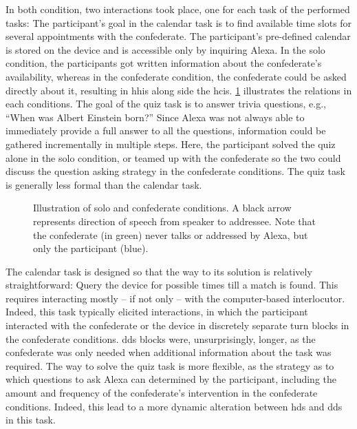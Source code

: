 In both condition, two interactions took place, one for each task of the performed tasks:
The participant's goal in the calendar task is to find available time slots for several appointments with the confederate.
The participant's pre-defined calendar is stored on the device and is accessible only by inquiring Alexa.
In the solo condition, the participants got written information about the confederate's availability, whereas in the confederate condition, the confederate could be asked directly about it, resulting in \acp{hhi} along side the \acp{hci}.
\cref{fig:conditions_comparison} illustrates the relations in each conditions.
The goal of the quiz task is to answer trivia questions, e.g., \enquote{When was Albert Einstein born?}
Since Alexa was not always able to immediately provide a full answer to all the questions, information could be gathered incrementally in multiple steps.
Here, the participant solved the quiz alone in the solo condition, or teamed up with the confederate so the two could discuss the question asking strategy in the confederate conditions.
The quiz task is generally less formal than the calendar task.
%
\begin{figure}[t]
	\centering
	\hfill
	\caption[Solo and confederate conditions in \acs{hhci} setting]
		{Illustration of solo and confederate conditions.
		A black arrow represents direction of speech from speaker to addressee.
		Note that the confederate (in green) never talks or addressed by Alexa, but only the participant (blue).}
	\label{fig:conditions_comparison}
\end{figure}
%
The calendar task is designed so that the way to its solution is relatively straightforward:
Query the device for possible times till a match is found.
This requires interacting mostly -- if not only -- with the computer-based interlocutor.
Indeed, this task typically elicited interactions, in which the participant interacted with the confederate or the device in discretely separate turn blocks in the confederate conditions.
\ac{dds} blocks were, unsurprisingly, longer, as the confederate was only needed when additional information about the task was required.
The way to solve the quiz task is more flexible, as the strategy as to which questions to ask Alexa can determined by the participant, including the amount and frequency of the confederate's intervention in the confederate conditions.
Indeed, this lead to a more dynamic alteration between \ac{hds} and \ac{dds} in this task.

